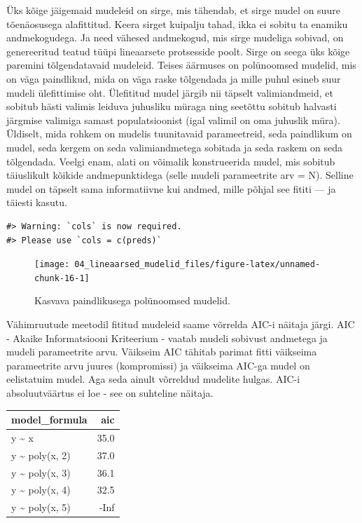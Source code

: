 \documentclass[]{book}
\begin{document}
Üks kõige jäigemaid mudeleid on sirge, mis tähendab, et sirge mudel on
suure tõenäosusega alafittitud. Keera sirget kuipalju tahad, ikka ei
sobitu ta enamiku andmekogudega. Ja need vähesed andmekogud, mis sirge
mudeliga sobivad, on genereeritud teatud tüüpi lineaarsete protsesside
poolt. Sirge on seega üks kõige paremini tõlgendatavaid mudeleid. Teises
äärmuses on polünoomsed mudelid, mis on väga paindlikud, mida on väga
raske tõlgendada ja mille puhul esineb suur mudeli ülefittimise oht.
Ülefititud mudel järgib nii täpselt valimiandmeid, et sobitub hästi
valimis leiduva juhusliku müraga ning seetõttu sobitub halvasti järgmise
valimiga samast populatsioonist (igal valimil on oma juhuslik müra).
Üldiselt, mida rohkem on mudelis tuunitavaid parameetreid, seda
paindlikum on mudel, seda kergem on seda valimiandmetega sobitada ja
seda raskem on seda tõlgendada. Veelgi enam, alati on võimalik
konstrueerida mudel, mis sobitub täiuslikult kõikide andmepunktidega
(selle mudeli parameetrite arv = N). Selline mudel on täpselt sama
informatiivne kui andmed, mille põhjal see fititi --- ja täiesti kasutu.

\begin{verbatim}
#> Warning: `cols` is now required.
#> Please use `cols = c(preds)`
\end{verbatim}

\begin{figure}

{\centering \texttt{[image: 04\_lineaarsed\_mudelid\_files/figure-latex/unnamed-chunk-16-1]} 

}

\caption{Kasvava paindlikusega polünoomsed mudelid.}\label{fig:unnamed-chunk-16}
\end{figure}

Vähimruutude meetodil fititud mudeleid saame võrrelda AIC-i näitaja
järgi. AIC - Akaike Informatsiooni Kriteerium - vaatab mudeli sobivust
andmetega ja mudeli parameetrite arvu. Väikseim AIC tähitab parimat
fitti väikseima parameetrite arvu juures (kompromissi) ja väikseima
AIC-ga mudel on eelistatuim mudel. Aga seda ainult võrreldud mudelite
hulgas. AIC-i absoluutväärtus ei loe - see on suhteline näitaja.

\begin{tabular}{lr}
\toprule
model\_formula & aic\\
\midrule
y \textasciitilde{} x & 35.0\\
y \textasciitilde{} poly(x, 2) & 37.0\\
y \textasciitilde{} poly(x, 3) & 36.1\\
y \textasciitilde{} poly(x, 4) & 32.5\\
y \textasciitilde{} poly(x, 5) & -Inf\\
\bottomrule
\end{tabular}
\end{document}
